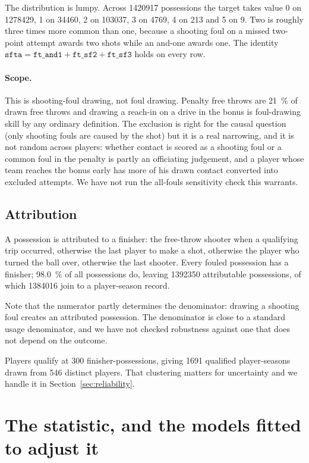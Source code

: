 \documentclass[11pt,letterpaper]{article}
\begin{document}
The distribution is lumpy. Across \num{1420917} possessions the target takes
value 0 on \num{1278429}, 1 on \num{34460}, 2 on \num{103037}, 3 on \num{4769},
4 on 213 and 5 on 9. Two is roughly three times more common than one, because a
shooting foul on a missed two-point attempt awards two shots while an and-one
awards one. The identity
$\texttt{sfta} = \texttt{ft\_and1} + \texttt{ft\_sf2} + \texttt{ft\_sf3}$ holds
on every row.

\paragraph{Scope.} This is shooting-foul drawing, not foul drawing. Penalty free
throws are \SI{21}{\percent} of drawn free throws and drawing a reach-in on a
drive in the bonus is foul-drawing skill by any ordinary definition. The
exclusion is right for the causal question (only shooting fouls are caused by the
shot) but it is a real narrowing, and it is not random across players: whether
contact is scored as a shooting foul or a common foul in the penalty is partly an
officiating judgement, and a player whose team reaches the bonus early has more
of his drawn contact converted into excluded attempts. We have not run the
all-fouls sensitivity check this warrants.

\subsection{Attribution}

A possession is attributed to a finisher: the free-throw shooter when a
qualifying trip occurred, otherwise the last player to make a shot, otherwise the
player who turned the ball over, otherwise the last shooter. Every fouled
possession has a finisher; \SI{98.0}{\percent} of all possessions do, leaving
\num{1392350} attributable possessions, of which \num{1384016} join to a
player-season record.

Note that the numerator partly determines the denominator: drawing a shooting
foul creates an attributed possession. The denominator is close to a standard
usage denominator, and we have not checked robustness against one that does not
depend on the outcome.

Players qualify at 300 finisher-possessions, giving \num{1691} qualified
player-seasons drawn from 546 distinct players. That clustering matters for
uncertainty and we handle it in Section~\ref{sec:reliability}.

\section{The statistic, and the models fitted to adjust it}
\end{document}
